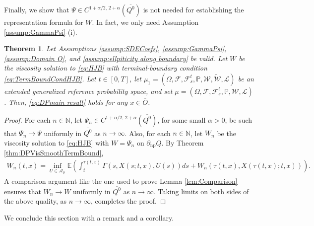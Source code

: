 \documentclass[amscd,amssymb,11pt]{article}
\newtheorem{theorem}{Theorem}
\numberwithin{theorem}{section}
\numberwithin{equation}{section}
\begin{document}
Finally, we show that $\Psi\in C^{1+\alpha/2,\,2+\alpha}(\overline{Q^{0}})$ is not needed for establishing the representation formula for $W$. In fact, we only need Assumption \ref{assump:GammaPsi}-(i).
\begin{theorem}\label{thm:DPVisContTermBound}
Let Assumptions \ref{assump:SDECoefs}, \ref{assump:GammaPsi}, \ref{assump:Domain O}, and \ref{assump:ellpiticity along boundary} be valid. Let $W$ be the viscosity solution to \eqref{eq:HJB} with terminal-boundary condition \eqref{eq:TermBoundCondHJB}. Let $t\in[0,T]$, let $\mu_{1}=(\Omega,\mathscr{F},\mathscr{F}_{s}^{t},\mathbb{P},\mathcal{W},\widetilde{\mathcal{W}},\mathcal{L})$ be an extended generalized reference probability space, and set $\mu=(\Omega,\mathscr{F},\mathscr{F}_{s}^{t},\mathbb{P},\mathcal{W},\mathcal{L})$. Then, \eqref{eq:DPmain result} holds for any $x\in\overline{O}$.
\end{theorem}
\begin{proof}
For each $n\in\mathbb{N}$, let $\Psi_{n}\in C^{1+\alpha/2,\,2+\alpha}(\overline{Q^{0}})$, for some small $\alpha>0$, be such that $\Psi_{n}\rightarrow\Psi$ uniformly in $\overline{Q^{0}}$ as $n\rightarrow\infty$. Also, for each $n\in\mathbb{N}$, let $W_{n}$ be the viscosity solution to \eqref{eq:HJB} with $W=\Psi_{n}$ on $\partial_{\text{np}}Q$. By Theorem \ref{thm:DPVisSmoothTermBound},
\begin{align*}
W_{n}(t,x)=\inf_{U\in\mathcal{A}_{\mu}}\mathbb{E}\left(\int_{t}^{\tau(t,x)}\Gamma\left(s,X(s;t,x),U(s)\right)ds+W_{n}\left(\tau
(t,x),X(\tau(t,x);t,x)\right)\right).
\end{align*}
A comparison argument like the one used to prove Lemma \ref{lem:Comparison} ensures that $W_{n}\rightarrow W$ uniformly in $\overline{Q^{0}}$ as $n\rightarrow\infty$. Taking limits on both sides of the above quality, as $n\rightarrow\infty$, completes the proof.
\end{proof}

We conclude this section with a remark and a corollary.
\end{document}
